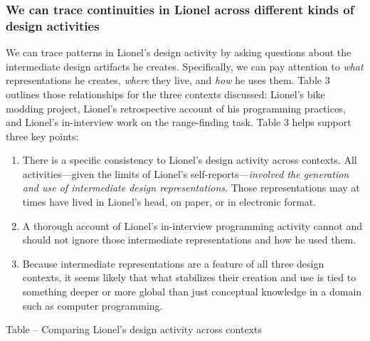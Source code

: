\subsubsection{\texorpdfstring{\protect\hypertarget{ux5fToc247188557}{}{\protect\hypertarget{ux5fToc252445930}{}{}}We
can trace continuities in Lionel across different kinds of design
activities}{We can trace continuities in Lionel across different kinds of design activities}}\label{we-can-trace-continuities-in-lionel-across-different-kinds-of-design-activities}

We can trace patterns in Lionel's design activity by asking questions
about the intermediate design artifacts he creates. Specifically, we can
pay attention to \emph{what} representations he creates, \emph{where}
they live, and \emph{how} he uses them. Table 3 outlines those
relationships for the three contexts discussed: Lionel's bike modding
project, Lionel's retrospective account of his programming practices,
and Lionel's in-interview work on the range-finding task. Table 3 helps
support three key points:

\begin{enumerate}
\def\labelenumi{\arabic{enumi}.}
\item
  There is a specific consistency to Lionel's design activity across
  contexts. All activities---given the limits of Lionel's
  self-reports---\emph{involved the generation and use of intermediate
  design representations}. Those representations may at times have lived
  in Lionel's head, on paper, or in electronic format.
\item
  A thorough account of Lionel's in-interview programming activity
  cannot and should not ignore those intermediate representations and
  how he used them.
\item
  Because intermediate representations are a feature of all three design
  contexts, it seems likely that what stabilizes their creation and use
  is tied to something deeper or more global than just conceptual
  knowledge in a domain such as computer programming.
\end{enumerate}

\protect\hypertarget{ux5fToc252445960}{}{}Table -- Comparing Lionel's
design activity across contexts


